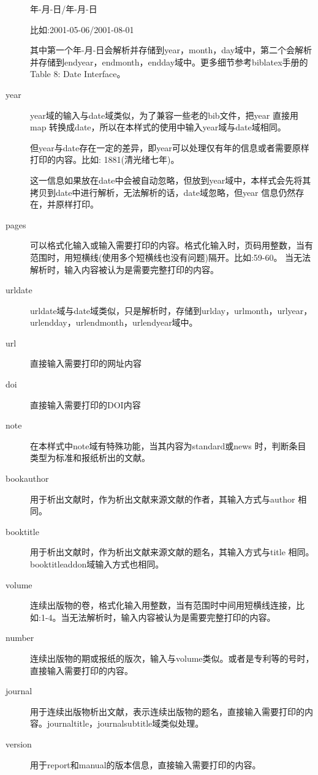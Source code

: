 \begin{description}
      年-月-日/年-月-日

      比如:2001-05-06/2001-08-01

      其中第一个年-月-日会解析并存储到year，month，day域中，第二个会解析并存储到endyear，endmonth，endday域中。更多细节参考biblatex手册的Table 8: Date Interface。

  \item[year] year域的输入与date域类似，为了兼容一些老的bib文件，把year 直接用map 转换成date，所以在本样式的使用中输入year域与date域相同。

      但year与date存在一定的差异，即year可以处理仅有年的信息或者需要原样打印的内容。比如:
      1881(清光绪七年)。

      这一信息如果放在date中会被自动忽略，但放到year域中，本样式会先将其拷贝到date中进行解析，无法解析的话，date域忽略，但year 信息仍然存在，并原样打印。

  \item[pages] 可以格式化输入或输入需要打印的内容。格式化输入时，页码用整数，当有范围时，用短横线(使用多个短横线也没有问题)隔开。比如:59-60。 当无法解析时，输入内容被认为是需要完整打印的内容。
  \item[urldate] urldate域与date域类似，只是解析时，存储到urlday，urlmonth，urlyear，urlendday，urlendmonth，urlendyear域中。
  \item[url] 直接输入需要打印的网址内容
  \item[doi] 直接输入需要打印的DOI内容
  \item[note] 在本样式中note域有特殊功能，当其内容为standard或news 时，判断条目类型为标准和报纸析出的文献。
  \item[bookauthor] 用于析出文献时，作为析出文献来源文献的作者，其输入方式与author 相同。
  \item[booktitle] 用于析出文献时，作为析出文献来源文献的题名，其输入方式与title 相同。booktitleaddon域输入方式也相同。
  \item[volume] 连续出版物的卷，格式化输入用整数，当有范围时中间用短横线连接，比如:1-4。当无法解析时，输入内容被认为是需要完整打印的内容。
  \item[number] 连续出版物的期或报纸的版次，输入与volume类似。或者是专利等的号时，直接输入需要打印的内容。
  \item[journal] 用于连续出版物析出文献，表示连续出版物的题名，直接输入需要打印的内容。journaltitle，journalsubtitle域类似处理。
   \item[version] 用于report和manual的版本信息，直接输入需要打印的内容。
\end{description}

